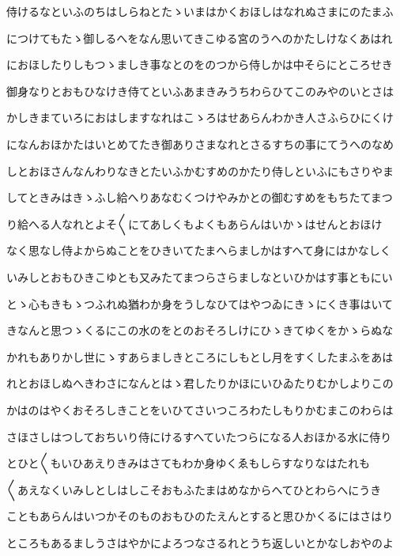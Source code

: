 \documentclass[a4paper,11pt,landscape]{ltjtarticle}
\begin{document}
\par\medskip
侍けるなといふのちはしらねとたゝいまはかくおほしはなれぬさまにのたまふ
\par\medskip
につけてもたゝ御しるへをなん思いてきこゆる宮のうへのかたしけなくあはれ
\par\medskip
におほしたりしもつゝましき事なとのをのつから侍しかは中そらにところせき
\par\medskip
御身なりとおもひなけき侍てといふあまきみうちわらひてこのみやのいとさは
\par\medskip
かしきまていろにおはしますなれはこゝろはせあらんわかき人さふらひにくけ
\par\medskip
になんおほかたはいとめてたき御ありさまなれとさるすちの事にてうへのなめ
\par\medskip
しとおほさんなんわりなきとたいふかむすめのかたり侍しといふにもさりやま
\par\medskip
してときみはきゝふし給へりあなむくつけやみかとの御むすめをもちたてまつ
\par\medskip
り給へる人なれとよそ〱にてあしくもよくもあらんはいかゝはせんとおほけ
\par\medskip
なく思なし侍よからぬことをひきいてたまへらましかはすへて身にはかなしく
\par\medskip
いみしとおもひきこゆとも又みたてまつらさらましなといひかはす事ともにい
\par\medskip
とゝ心もきもゝつふれぬ猶わか身をうしなひてはやつゐにきゝにくき事はいて
\par\medskip
きなんと思つゝくるにこの水のをとのおそろしけにひゝきてゆくをかゝらぬな
\par\medskip
かれもありかし世にゝすあらましきところにしもとし月をすくしたまふをあは
\par\medskip
れとおほしぬへきわさになんとはゝ君したりかほにいひゐたりむかしよりこの
\par\medskip
かはのはやくおそろしきことをいひてさいつころわたしもりかむまこのわらは
\par\medskip
さほさしはつしておちいり侍にけるすへていたつらになる人おほかる水に侍り
\par\medskip
とひと〱もいひあえりきみはさてもわか身ゆくゑもしらすなりなはたれも
\par\medskip
〱あえなくいみしとしはしこそおもふたまはめなからへてひとわらへにうき
\par\medskip
こともあらんはいつかそのものおもひのたえんとすると思ひかくるにはさはり
\par\medskip
ところもあるましうさはやかによろつなさるれとうち返しいとかなしおやのよ
\par\medskip
\end{document}
